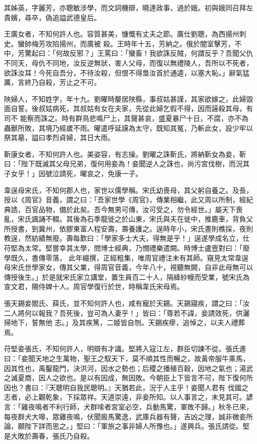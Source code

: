 \begin{pinyinscope}
 其姊英，字麗芳，亦聰敏涉學，而文詞機辯，曉達政事，過於娥。初與娥同召拜左貴嬪，尋卒，偽追謚武德皇后。



 王廣女者，不知何許人也。容質甚美，慷慨有丈夫之節。廣仕劉聰，為西揚州刺史。蠻帥梅芳攻陷揚州，而廣被
 殺。王時年十五，芳納之。俄於闇室擊芳，不中，芳驚起曰：「何故反邪？」王罵曰：「蠻畜！我欲誅反賊，何謂反乎？吾聞父仇不同天，母仇不同地，汝反逆無狀，害人父母，而復以無禮陵人，吾所以不死者，欲誅汝耳！今死自吾分，不待汝殺，但恨不得梟汝首於通逵，以塞大恥。」辭氣猛厲，言終乃自殺，芳止之不可。



 陜婦人，不知姓字，年十九。劉曜時嫠居陜縣，事叔姑甚謹，其家欲嫁之，此婦毀面自誓。後叔姑病死，其叔姑有女在夫家，先從此婦乞假不得，因而誣殺其母，有司不
 能察而誅之。時有群鳥悲鳴尸上，其聲甚哀，盛夏暴尸十日，不腐，亦不為蟲獸所敗，其境乃經歲不雨。曜遣呼延謨為太守，既知其冤，乃斬此女，設少牢以祭其墓，謚曰孝烈貞婦，其日大雨。



 靳康女者，不知何許人也。美姿容，有志操。劉曜之誅靳氏，將納靳女為妾，靳曰：「陛下既滅其父母兄弟，復何用妾為！妾聞逆人之誅也，尚污宮伐樹，而況其子女乎！」因號泣請死，曜哀之，免康一子。



 韋逞母宋氏，不知何郡人也，家世以儒學稱。宋氏幼喪母，其父躬自養之。及長，授以《周官》音義，謂之曰：「吾家世學《周官》，傳業相繼，此又周以所制，經紀典誥，百官品物，備於此矣。吾今無男可傳，汝可受之，勿令經世。」屬天下喪亂，宋氏諷誦不輟。其後為石季龍徙之於山東，宋氏與夫在徙中，推鹿車，背負父所授書，到冀州，依膠東富人程安壽，壽養護之。逞時年小，宋氏晝則樵採，夜則教逞，然紡績無廢。壽每歎曰：「學家多士大夫，得無是乎！」逞遂學成名立，仕苻堅為太常。堅嘗幸其太學，問博士經典，乃憫禮樂遣闕。時博士盧壼對曰：「廢學既久，書傳零落，
 此年綴撰，正經粗集，唯周官禮注未有其師。窺見太常韋逞母宋氏世學家女，傳其父業，得周官音義，今年八十，視聽無闕，自非此母無可以傳授後生。」於是就宋氏家立講堂，置生員百二十人，隔絳紗幔而受業，號宋氏為宣文君，賜侍婢十人。周官學復行於世，時稱韋氏宋母焉。



 張天錫妾閻氏、薛氏，並不知何許人也，咸有寵於天錫。天錫寢疾，謂之曰：「汝二人將何以報我？吾死後，豈可為人妻乎！」皆曰：「尊若不諱，妾請效死，供灑掃地下，誓無他
 志。」及其疾篤，二姬皆自刎。天錫疾瘳，追悼之，以夫人禮葬焉。



 苻堅妾張氏，不知何許人，明辯有才識。堅將入寇江左，群臣切諫不從。張氏進曰：「妾聞天地之生萬物，聖王之馭天下，莫不順其性而暢之，故黃帝服牛乘馬，因其性也，禹鑿龍門，決洪河，因水之勢也；后稷之播殖百穀，因地之氣也；湯武之滅夏商，因人之欲也。是以有因成，無因敗。今朝臣上下皆言不可，陛下復何所因也？書曰：『天聰明自我民聰明。』天猶若此，況于人主乎！妾聞人君有
 伐國之志者，必上觀乾象，下採眾祥。天道崇遠，非妾所知。以人事言之，未見其可。諺言：「雞夜鳴者不利行師，犬群嗦者宮室必空，兵動馬驚，軍敗不歸。」秋冬已來，每夜群犬大嗥，眾雞夜鳴，伏聞廄馬驚逸，武庫兵器有聲，吉凶之理，誠非微妾所論，願陛下詳而思之。」堅曰：「軍旅之事非婦人所豫也。」遂興兵。張氏請從。堅是大敗於壽春，張氏乃自殺。




\end{pinyinscope}
